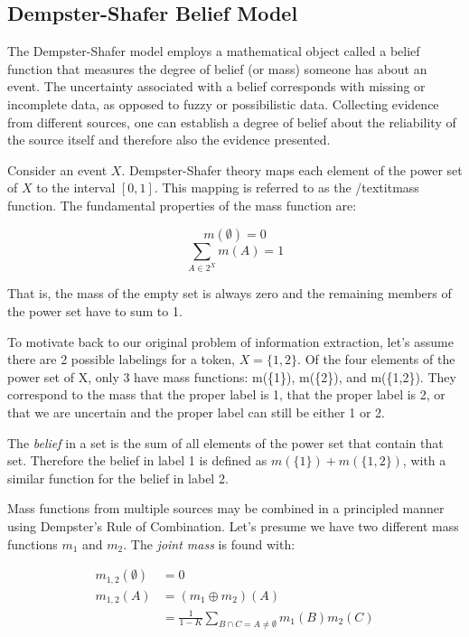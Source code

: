\subsection{Dempster-Shafer Belief Model}
The Dempster-Shafer model \cite{dempster67} \cite{shafer76} employs a mathematical object called a belief function that measures the degree of belief (or mass) someone has about an event.  The uncertainty associated with a belief corresponds with missing or incomplete data, as opposed to fuzzy or possibilistic data.  Collecting evidence from different sources, one can establish a degree of belief about the reliability of the source itself and therefore also the evidence presented.

Consider an event $X$.  Dempster-Shafer theory maps each element of the power set of $X$ to the interval $[0,1]$.  This mapping is referred to as the /textit{mass function}.  The fundamental properties of the mass function are:

\begin{equation*}
m(\emptyset) = 0
\end{equation*}
\begin{equation*}
\sum_{A\in2^{X}} m(A) = 1
\end{equation*}

That is, the mass of the empty set is always zero and the remaining members of the power set have to sum to 1.

To motivate back to our original problem of information extraction, let's assume there are 2 possible labelings for a token, $X=\{1,2\}$.  Of the four elements of the power set of X, only 3 have mass functions: m(\{1\}), m(\{2\}), and m(\{1,2\}).  They correspond to the mass that the proper label is 1, that the proper label is 2, or that we are uncertain and the proper label can still be either 1 or 2.

The \textit{belief} in a set is the sum of all elements of the power set that contain that set.  Therefore the belief in label 1 is defined as $m(\{1\})+m(\{1,2\})$, with a similar function for the belief in label 2.

Mass functions from multiple sources may be combined in a principled manner using Dempster's Rule of Combination.  Let's presume we have two different mass functions $m_{1}$ and $m_{2}$.  The \textit{joint mass} is found with:

\begin{equation*}
\begin{split}
m_{1,2}(\emptyset) &=0\\
m_{1,2}(A) &=(m_{1}\oplus m_{2})(A)\\
                   &=\frac{1}{1-K} \sum_{B\cap C=A\neq\emptyset} m_{1}(B)m_{2}(C)
\end{split}
\end{equation*}

